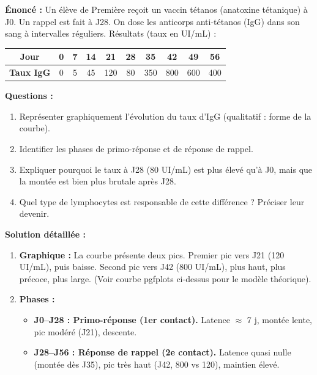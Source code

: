 \documentclass[11pt]{article}
\begin{document}
\begin{exoresolu}
\textbf{Énoncé :} Un élève de Première reçoit un vaccin tétanos (anatoxine tétanique) à J0. Un rappel est fait à J28. On dose les anticorps anti-tétanos (IgG) dans son sang à intervalles réguliers. Résultats (taux en UI/mL) :

\begin{center}
\begin{tabular}{|c|c|c|c|c|c|c|c|c|c|}\hline
\textbf{Jour} & 0 & 7 & 14 & 21 & 28 & 35 & 42 & 49 & 56 \\ \hline
\textbf{Taux IgG} & 0 & 5 & 45 & 120 & 80 & 350 & 800 & 600 & 400 \\ \hline
\end{tabular}
\end{center}

\textbf{Questions :}
\begin{enumerate}
    \item Représenter graphiquement l'évolution du taux d'IgG (qualitatif : forme de la courbe).
    \item Identifier les phases de primo-réponse et de réponse de rappel.
    \item Expliquer pourquoi le taux à J28 (80 UI/mL) est plus élevé qu'à J0, mais que la montée est bien plus brutale après J28.
    \item Quel type de lymphocytes est responsable de cette différence ? Préciser leur devenir.
\end{enumerate}

\tcblower
\textbf{Solution détaillée :}

\begin{enumerate}
    \item \textbf{Graphique :} La courbe présente deux pics. Premier pic vers J21 (120 UI/mL), puis baisse. Second pic vers J42 (800 UI/mL), plus haut, plus précoce, plus large. (Voir courbe pgfplots ci-dessus pour le modèle théorique).
    
    \item \textbf{Phases :}
    \begin{itemize}
        \item \textbf{J0--J28 : Primo-réponse (1er contact).} Latence $\approx$ 7 j, montée lente, pic modéré (J21), descente.
        \item \textbf{J28--J56 : Réponse de rappel (2e contact).} Latence quasi nulle (montée dès J35), pic très haut (J42, 800 vs 120), maintien élevé.
    \end{itemize}
    

\end{enumerate}
\end{exoresolu}
\end{document}
